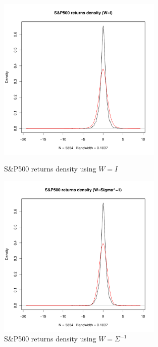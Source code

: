 \begin{figure}\label{SP500_returns_density}
    \centering
    \includegraphics[width=0.7\textwidth]{S&P500_returns_density_(W=I).pdf}
    \caption{S\&P500 returns density using $W=I$}
    \includegraphics[width=0.7\textwidth]{S&P500_returns_density_(W=Sigma^-1).pdf}
    \caption{S\&P500 returns density using $W=\Sigma^{-1}$}
\end{figure}